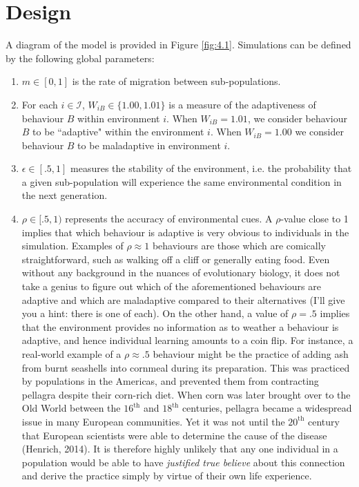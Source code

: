 \documentclass[a4paper,8pt]{extarticle}
\begin{document}
\section{Design}
A diagram of the model is provided in Figure \ref{fig:4.1}. Simulations can be defined by the following global parameters:
\begin{enumerate}
    \item $m\in[0,1]$ is the rate of migration between sub-populations.
    \item For each $i\in \mathcal I$, $W_{iB}\in\{1.00, 1.01\}$ is a measure of the adaptiveness of behaviour $B$ within environment $i$. When $W_{iB}=1.01$, we consider behaviour $B$ to be ``adaptive" within the environment $i$. When $W_{iB}=1.00$ we consider behaviour $B$ to be maladaptive in environment $i$.
    \item $\epsilon\in[.5,1]$ measures the stability of the environment, i.e. the probability that a given sub-population will experience the same environmental condition in the next generation. 
    \item $\rho\in[.5,1)$ represents the accuracy of environmental cues. A $\rho$-value close to 1 implies that which behaviour is adaptive is very obvious to individuals in the simulation. Examples of $\rho\approx 1$ behaviours are those which are comically straightforward, such as walking off a cliff or generally eating food. Even without any background in the nuances of evolutionary biology, it does not take a genius to figure out which of the aforementioned behaviours are adaptive and which are maladaptive compared to their alternatives (I'll give you a hint: there is one of each). On the other hand, a value of $\rho=.5$ implies that the environment provides no information as to weather a behaviour is adaptive, and hence individual learning amounts to a coin flip. For instance, a real-world example of a $\rho\approx.5$ behaviour might be the practice of adding ash from burnt seashells into cornmeal during its preparation. This was practiced by populations in the Americas, and prevented them from contracting pellagra despite their corn-rich diet. When corn was later brought over to the Old World between the $16^{\text{th}}$ and $18^{\text{th}}$ centuries, pellagra became a widespread issue in many European communities. Yet it was not until the $20^{\text{th}}$ century that European scientists were able to determine the cause of the disease (Henrich, 2014). It is therefore highly unlikely that any one individual in a population would be able to have \emph{justified true believe} about this connection and derive the practice simply by virtue of their own life experience.
\end{enumerate}
\end{document}
